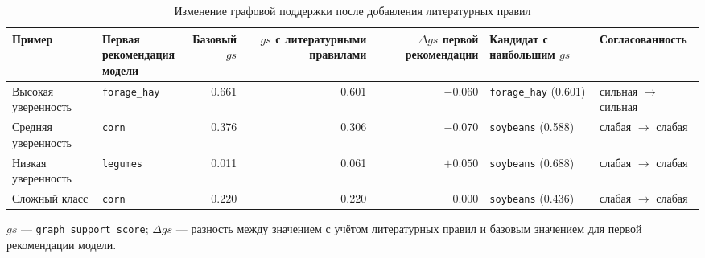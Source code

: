 \begin{table}[H]
\centering
\scriptsize
\caption{Изменение графовой поддержки после добавления литературных правил}
\label{tab:literature-effect}
\setlength{\tabcolsep}{2pt}
\begin{tabular}{@{}>{\raggedright\arraybackslash}p{}
                >{\raggedright\arraybackslash}p{}
                r
                r
                r
                >{\raggedright\arraybackslash}p{}
                >{\raggedright\arraybackslash}p{}@{}}
\toprule
Пример & \makecell[l]{Первая\\рекомендация\\модели} & \makecell[r]{Базовый\\$gs$} & \makecell[r]{$gs$ с\\литературными\\правилами} & \makecell[r]{$\Delta gs$\\первой\\рекомендации}
    & \makecell[l]{Кандидат с\\наибольшим $gs$} & Согласованность \\
\midrule
Высокая уверенность
  & \texttt{forage\_hay}
  & 0.661
  & 0.601
  & $-0.060$
  & \texttt{forage\_hay} (0.601)
  & сильная $\rightarrow$ сильная \\
Средняя уверенность
  & \texttt{corn}
  & 0.376
  & 0.306
  & $-0.070$
  & \texttt{soybeans} (0.588)
  & слабая $\rightarrow$ слабая \\
Низкая уверенность
  & \texttt{legumes}
  & 0.011
  & 0.061
  & $+0.050$
  & \texttt{soybeans} (0.688)
  & слабая $\rightarrow$ слабая \\
Сложный класс
  & \texttt{corn}
  & 0.220
  & 0.220
  & $\phantom{+}0.000$
  & \texttt{soybeans} (0.436)
  & слабая $\rightarrow$ слабая \\
\bottomrule
\end{tabular}

\vspace{0.4em}
\footnotesize $gs$ --- \texttt{graph\_support\_score}; $\Delta gs$ --- разность между значением с учётом литературных правил
и базовым значением для первой рекомендации модели.
\normalsize
\end{table}
